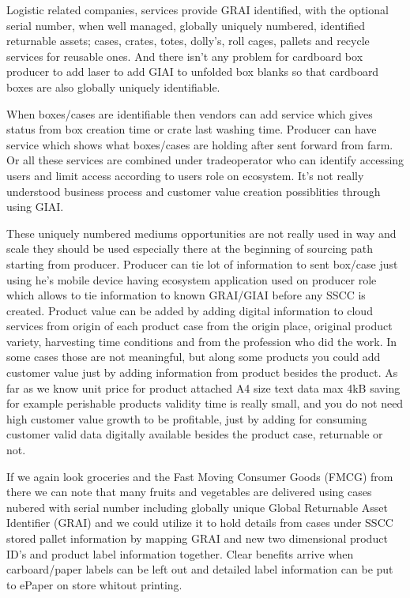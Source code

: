 Logistic related companies, services provide GRAI\cite{GRAI} identified, with
the optional serial number, when well managed, globally uniquely numbered,
identified returnable assets; cases, crates, totes, dolly's, roll cages,
pallets and recycle services for reusable ones. And there isn't any problem for
cardboard box producer to add laser to add GIAI\cite{GIAI}\cite{CajoMakeBright}
to unfolded box blanks so that cardboard boxes are also globally uniquely
identifiable.

When boxes/cases are identifiable then vendors can add service which gives
status from box creation time or crate last washing time. Producer can have
service which shows what boxes/cases are holding after sent forward from farm.
Or all these services are combined under tradeoperator who can identify
accessing users and limit access according to users role on ecosystem. It's not
really understood business process and customer value creation possiblities
through using GIAI.

These uniquely numbered mediums opportunities are not really used in way and
scale they should be used especially there at the beginning of sourcing path
starting from producer. Producer can tie lot of information to sent box/case
just using he's mobile device having ecosystem application used on producer
role which allows to tie information to known GRAI/GIAI before any SSCC is
created. Product value can be added by adding digital information to cloud
services from origin of each product case from the origin place, original
product variety, harvesting time conditions and from the profession who did
the work. In some cases those are not meaningful, but along some products you
could add customer value just by adding information from product besides the
product. As far as we know unit price for product attached A4 size text data
max 4kB saving for example perishable products validity time is really small,
and you do not need high customer value growth to be profitable, just by
adding for consuming customer valid data digitally available besides the
product case, returnable or not.

If we again look groceries and the Fast Moving Consumer Goods (FMCG) from there
we can note that many fruits and vegetables are delivered using cases nubered
with serial number including globally unique Global Returnable Asset Identifier
(GRAI) and we could utilize it to hold details from cases under SSCC stored
pallet information by mapping GRAI and new two dimensional product ID's and
product label information together. Clear benefits arrive when carboard/paper
labels can be left out and detailed label information can be put to ePaper on
store whitout printing.

